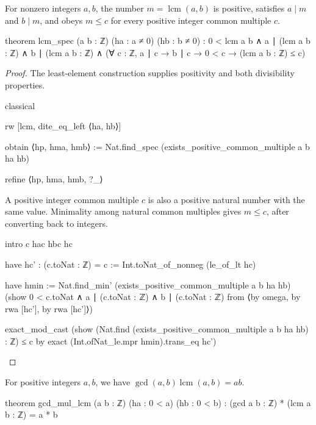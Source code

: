 \begin{theorem}
  \label{ent:thm:lcm-spec}
  For nonzero integers $a,b$, the number $m=\operatorname{lcm}(a,b)$ is positive, satisfies $a\mid
    m$ and $b\mid m$, and obeys $m\le c$ for every positive integer common multiple $c$.

  \begin{lean}
    theorem lcm_spec (a b : ℤ) (ha : a ≠ 0) (hb : b ≠ 0) :
        0 < lcm a b ∧ a ∣ (lcm a b : ℤ) ∧ b ∣ (lcm a b : ℤ) ∧
          (∀ c : ℤ, a ∣ c → b ∣ c → 0 < c → (lcm a b : ℤ) ≤ c)
  \end{lean}
\end{theorem}

\begin{proof}

  The least-element construction supplies positivity and both divisibility properties.

  \begin{lean}
    classical

    rw [lcm, dite_eq_left ⟨ha, hb⟩]

    obtain ⟨hp, hma, hmb⟩ := Nat.find_spec (exists_positive_common_multiple a b ha hb)

    refine ⟨hp, hma, hmb, ?_⟩
  \end{lean}

  A positive integer common multiple $c$ is also a positive natural number with the same value.
  Minimality among natural common multiples gives $m\le c$, after converting back to integers.

  \begin{lean}
    intro c hac hbc hc

    have hc' : (c.toNat : ℤ) = c := Int.toNat_of_nonneg (le_of_lt hc)

    have hmin := Nat.find_min' (exists_positive_common_multiple a b ha hb)
      (show 0 < c.toNat ∧ a ∣ (c.toNat : ℤ) ∧ b ∣ (c.toNat : ℤ) from
        ⟨by omega, by rwa [hc'], by rwa [hc']⟩)

    exact_mod_cast (show (Nat.find (exists_positive_common_multiple a b ha hb) : ℤ) ≤ c by
      exact (Int.ofNat_le.mpr hmin).trans_eq hc')
  \end{lean}

\end{proof}

\begin{theorem}
  \label{ent:thm:gcd-lcm-product}
  For positive integers $a,b$, we have $\gcd(a,b)\operatorname{lcm}(a,b)=ab$.

  \begin{lean}
    theorem gcd_mul_lcm (a b : ℤ) (ha : 0 < a) (hb : 0 < b) :
        (gcd a b : ℤ) * (lcm a b : ℤ) = a * b
  \end{lean}
\end{theorem}

